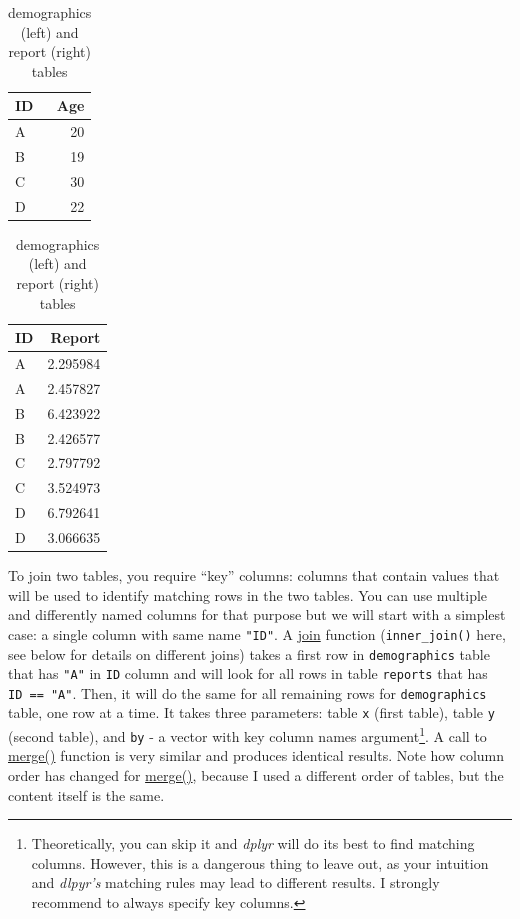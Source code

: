 \documentclass[
]{book}
\begin{document}
\begin{table}
\caption{\label{tab:unnamed-chunk-175}demographics (left) and report (right) tables}

\centering
\begin{tabular}[t]{l|r}
\hline
ID & Age\\
\hline
A & 20\\
\hline
B & 19\\
\hline
C & 30\\
\hline
D & 22\\
\hline
\end{tabular}
\centering
\begin{tabular}[t]{l|r}
\hline
ID & Report\\
\hline
A & 2.295984\\
\hline
A & 2.457827\\
\hline
B & 6.423922\\
\hline
B & 2.426577\\
\hline
C & 2.797792\\
\hline
C & 3.524973\\
\hline
D & 6.792641\\
\hline
D & 3.066635\\
\hline
\end{tabular}
\end{table}

To join two tables, you require ``key'' columns: columns that contain values that will be used to identify matching rows in the two tables. You can use multiple and differently named columns for that purpose but we will start with a simplest case: a single column with same name \texttt{"ID"}. A \href{https://dplyr.tidyverse.org/reference/mutate-joins.html}{join} function (\texttt{inner\_join()} here, see below for details on different joins) takes a first row in \texttt{demographics} table that has \texttt{"A"} in \texttt{ID} column and will look for all rows in table \texttt{reports} that has \texttt{ID\ ==\ "A"}. Then, it will do the same for all remaining rows for \texttt{demographics} table, one row at a time. It takes three parameters: table \texttt{x} (first table), table \texttt{y} (second table), and \texttt{by} - a vector with key column names argument\footnote{Theoretically, you can skip it and \emph{dplyr} will do its best to find matching columns. However, this is a dangerous thing to leave out, as your intuition and \emph{dlpyr's} matching rules may lead to different results. I strongly recommend to always specify key columns.}. A call to \href{https://stat.ethz.ch/R-manual/R-devel/library/base/html/merge.html}{merge()} function is very similar and produces identical results. Note how column order has changed for \href{https://stat.ethz.ch/R-manual/R-devel/library/base/html/merge.html}{merge()}, because I used a different order of tables, but the content itself is the same.
\end{document}
